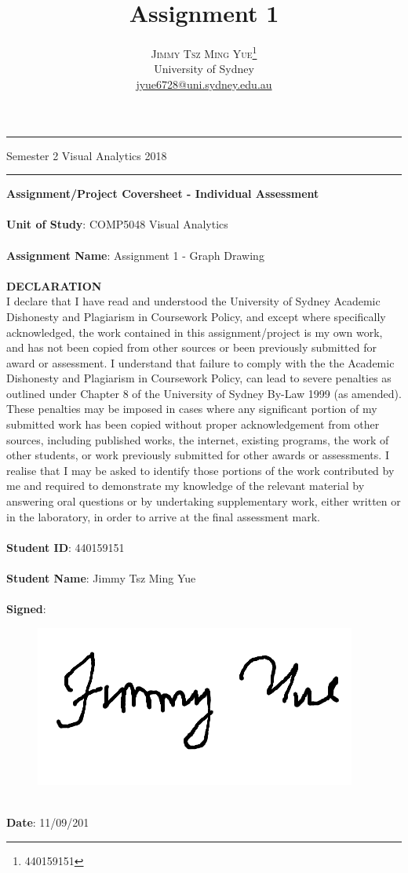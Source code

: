 \documentclass[twoside]{article}
\title{\vspace{-15mm}\fontsize{24pt}{10pt}\selectfont\textbf{Assignment 1}} %
\author{
\large
\textsc{Jimmy Tsz Ming Yue}\thanks{440159151}\\[2mm] %
\normalsize University of Sydney \\ %
\normalsize \href{mailto:jyue6728@uni.sydney.edu.au}{jyue6728@uni.sydney.edu.au} %
\vspace{-5mm}
}
\date{}
\theoremstyle{definition}
\theoremstyle{definition}
\begin{document}
\maketitle %

\thispagestyle{fancy} %
\hrule \smallskip

\noindent Semester 2 \quad Visual Analytics\hspace{9.5cm} 2018

\hrule

\vspace{1cm}
{\large\textbf{Assignment/Project Coversheet - Individual Assessment}}\\
\\
\textbf{Unit of Study}: COMP5048 Visual Analytics\\
\\
\textbf{Assignment Name}: Assignment 1 - Graph Drawing\\
\\
{\large\textbf{DECLARATION}}\\
I declare that I have read and understood the University of Sydney Academic Dishonesty
and Plagiarism in Coursework Policy, and except where specifically acknowledged, the
work contained in this assignment/project is my own work, and has not been copied from
other sources or been previously submitted for award or assessment.
I understand that failure to comply with the the Academic Dishonesty and Plagiarism in
Coursework Policy, can lead to severe penalties as outlined under Chapter 8 of the
University of Sydney By-Law 1999 (as amended). These penalties may be imposed in
cases where any significant portion of my submitted work has been copied without proper
acknowledgement from other sources, including published works, the internet, existing
programs, the work of other students, or work previously submitted for other awards or
assessments.
I realise that I may be asked to identify those portions of the work contributed by me and
required to demonstrate my knowledge of the relevant material by answering oral
questions or by undertaking supplementary work, either written or in the laboratory, in
order to arrive at the final assessment mark.\\
\\
\textbf{Student ID}: 440159151\\
\\
\textbf{Student Name}: Jimmy Tsz Ming Yue\\
\\
\textbf{Signed}:
\begin{figure}[h]
	\includegraphics[scale=0.15]{signature.png}
\end{figure}
\\ 
\textbf{Date}: 11/09/201
\end{document}
